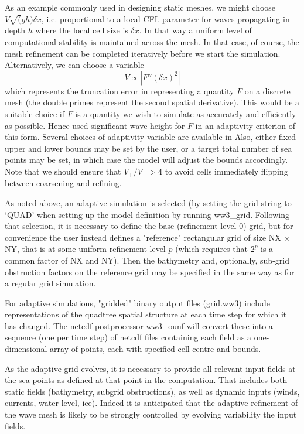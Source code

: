 As an example commonly used in designing static meshes, we might choose 
$V\sqrt(gh) \delta x$, i.e. proportional to a local CFL parameter for 
waves propagating in depth $h$ where the local cell size is $\delta x$.
In that way a uniform level of computational stability is maintained across 
the mesh. 
In that case, of course, the mesh refinement can be completed iteratively 
before we start the simulation. Alternatively, we can choose a variable 
$$V \propto |F''(\delta x)^2| $$
which represents the truncation error in representing a quantity $F$ on a
discrete mesh (the double primes represent the second spatial derivative). 
This would be a suitable choice if $F$ is a quantity we wish to simulate 
as accurately and efficiently as possible. Hence \citep{art:PGRT10xx} 
used significant wave height for $F$ in an adaptivity criterion of this form.
Several choices of adaptivity variable are available in \ws\. Also, either fixed upper and lower bounds may be set by the user, or a target total number of sea points may be set, in which case the model will adjust the bounds 
accordingly. Note that we should ensure that $V_+/V_- > 4$ to avoid cells
immediately flipping between coarsening and refining.  

As noted above, an adaptive simulation is selected (by setting the grid string 
to `{\code QUAD}' when setting up the model definition by running 
{\code ww3_grid}. Following that selection, it is necessary to define the 
base (refinement level 0) grid, but for convenience the user instead defines a 
"reference" rectangular grid of size {\code NX} $\times$ {\code NY}, that is 
at some uniform refinement level $p$ (which requires that $2^p$ is a common  factor of {\code NX} and {\code NY}). Then the bathymetry and, optionally, 
sub-grid obstruction factors on the reference grid may be specified in the 
same way as for a regular grid simulation.

For adaptive simulations, "gridded" binary output files (grid.ww3) include
representations of the quadtree spatial structure at each time step for
which it has changed. The netcdf postprocessor {\code ww3_ounf} will 
convert these into a sequence (one per time step) of netcdf files containing each field as a one-dimensional array of points, each with specified cell centre and bounds.

As the adaptive grid evolves, it is necessary to provide all relevant input 
fields at the sea points as defined at that point in the computation. That 
includes both static fields (bathymetry, subgrid obstructions), as well
as dynamic inputs (winds, currents, water level, ice). Indeed it is  anticipated that the adaptive refinement of the wave mesh is likely to 
be strongly controlled by evolving variability the input fields.

